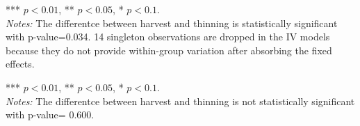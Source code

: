 \documentclass{article}
\begin{document}
\begin{table}[!htbp]
\centering
\caption*{Table 3.  Direct mitigation benefits from fuel reduction treatment on wildfire risk}
\begin{minipage}{\textwidth}
\footnotesize
*** $p<0.01$, ** $p<0.05$, * $p<0.1$.\\
\textit{Notes:} The differentce between harvest and thinning is statistically significant with p-value=0.034.
14 singleton observations are dropped in the IV models because they do not provide within-group variation after absorbing the fixed effects.
\end{minipage}
\end{table}





\begin{table}[!htbp]
\centering
\caption*{Table 4. Combined mitigation benefits from fuel reduction treatment on wildfire risk at county level}


\vspace{0.5em}

\begin{minipage}{\textwidth}
\footnotesize
*** $p<0.01$, ** $p<0.05$, * $p<0.1$.\\
\textit{Notes:} The differentce between harvest and thinning is not statistically significant with p-value= 0.600. 









\end{minipage}
\end{table}
\end{document}
